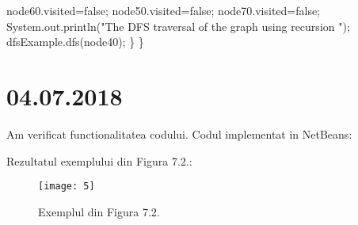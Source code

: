 \documentclass{report}
\begin{document}
        \hspace*{1cm}node60.visited=false;\newline
		\hspace*{1cm}node50.visited=false;\newline
		\hspace*{1cm}node70.visited=false;\newline
  		\hspace*{1cm}System.out.println("The DFS traversal of the graph using recursion ");\newline
		\hspace*{1cm}dfsExample.dfs(node40);\newline
	\hspace*{0.8cm}\}\newline 
\}

\chapter{04.07.2018}
Am verificat functionalitatea codului. \newline
Codul implementat in NetBeans:
\begin{figure}[ht]
  \hspace*{1.5cm}\subfloat[1]{\texttt{[image: 1]}} 
  \hspace*{1.5cm}\subfloat[2]{\texttt{[image: 2]}}\newline
  \hspace*{1.5cm}\subfloat[3]{\texttt{[image: 3]}}
  \hspace*{1.5cm}\subfloat[4]{\texttt{[image: 4]}}
\end{figure}

Rezultatul exemplului din Figura 7.2.:
\begin{figure}[ht]
\centering
\texttt{[image: 5]}
\caption{Exemplul din Figura 7.2.}
\end{figure}
\end{document}
